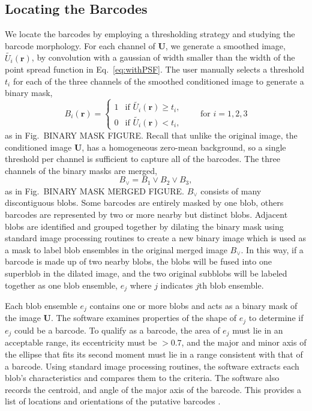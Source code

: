 \subsection{Locating the Barcodes} \label{sec:locatingBarcodes}
We locate the barcodes by employing a thresholding strategy and studying the barcode morphology. For each channel of $\mathbf{U}$, we generate a smoothed image, $\tilde{U_i}(\mathbf{r})$, by  convolution with a gaussian of width smaller than the width of the point spread function in Eq.~\ref{eq:withPSF}. The user manually selects a threshold $t_i$ for each of the three channels of the smoothed conditioned image to generate a binary mask,
\begin{equation}
	B_i(\mathbf{r}) = \left\{
	\begin{array}{rl}
		 1 & \text{if } \tilde{U_i}(\mathbf{r}) \geq t_i,\\
		 0 & \text{if } \tilde{U_i}(\mathbf{r}) < t_i,
	\end{array} \right. \qquad\text{for } i=1,2,3
\end{equation}
as in Fig.~BINARY MASK FIGURE. Recall that unlike the original image,  the conditioned image $\mathbf{U}$, has a homogeneous zero-mean  background, so a single threshold per channel is sufficient to capture all of the barcodes. The three channels of the binary masks are merged, 
\begin{equation}
B_\lor=B_1\lor B_2 \lor B_3, 
\end{equation}
as in Fig.~BINARY MASK MERGED FIGURE. $B_\lor$ consists of many discontiguous blobs. Some barcodes are entirely masked by one blob, others barcodes are represented by two or more nearby but distinct blobs. Adjacent blobs are identified and grouped together by dilating the binary mask using standard image processing routines to create a new binary image which is used as a mask to label blob ensembles in the original merged image $B_\lor$. In this way, if a barcode is made up of two nearby blobs, the blobs will be fused into one superblob in the dilated image, and the two original subblobs will be labeled together as one blob ensemble, $e_j$ where $j$ indicates $j$th blob ensemble.

Each blob ensemble $e_j$ contains one or more blobs and acts as a binary mask of the image $\mathbf{U}$. The software  examines properties of the shape of  $e_j$ to determine if  $e_j$ could be a barcode. To qualify as a barcode, the area of $e_j$ must lie in an acceptable range, its  eccentricity must be  $>0.7$,  and the major and minor axis of the ellipse that fits its second moment must lie in a range consistent with that of a barcode. Using standard image processing routines, the software extracts each blob's characteristics and compares them to the criteria. The software also records the centroid, and angle of the major axis of the barcode. This provides a list of locations and orientations of the putative barcodes	.


